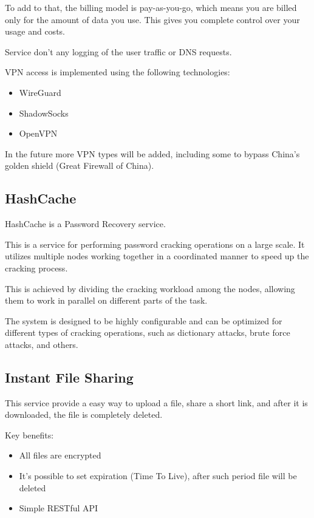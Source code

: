 To add to that, the billing model is pay-as-you-go, which means you are billed only for the amount of data you use.
This gives you complete control over your usage and costs.

Service don’t any logging of the user traffic or DNS requests.

VPN access is implemented using the following technologies:

\begin{itemize}
    \item WireGuard
    \item ShadowSocks
    \item OpenVPN
\end{itemize}

In the future more VPN types will be added, including some to bypass China's golden shield (Great Firewall of China).

\subsection{HashCache}

HashCache is a Password Recovery service.

This is a service for performing password cracking operations on a large scale.
It utilizes multiple nodes working together in a coordinated manner to speed up the cracking process.

This is achieved by dividing the cracking workload among the nodes,
allowing them to work in parallel on different parts of the task.

The system is designed to be highly configurable and can be optimized for different types of cracking operations, such as dictionary attacks, brute force attacks, and others.

\subsection{Instant File Sharing}

This service provide a easy way to upload a file, share a short link, and after it is downloaded, the file is completely deleted.

Key benefits:

\begin{itemize}
    \item All files are encrypted
    \item It's possible to set expiration (Time To Live), after such period file will be deleted
    \item Simple RESTful API
\end{itemize}
